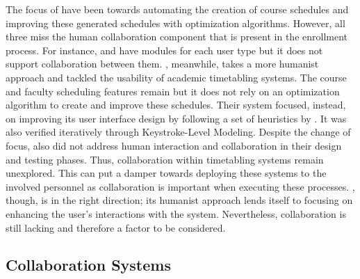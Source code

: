 The focus of \cite{Assyst, Assyst2, eAssyst, UPM, bulacanState, 2013Nigeria, Oprea2007, UniTime} have been towards automating the creation of course schedules and improving these generated schedules with optimization algorithms. However, all three miss the human collaboration component that is present in the enrollment process. For instance, \cite{Assyst} and \cite{Assyst2} have modules for each user type but it does not support collaboration between them. \cite{arrowSmith}, meanwhile, takes a more humanist approach and tackled the usability of academic timetabling systems. The course and faculty scheduling features remain but it does not rely on an optimization algorithm to create and improve these schedules. Their system focused, instead, on improving its user interface design by following a set of heuristics by \cite{Paz}. It was also verified iteratively through Keystroke-Level Modeling. Despite the change of focus, \cite{arrowSmith} also did not address human interaction and collaboration in their design and testing phases. Thus, collaboration within timetabling systems remain unexplored. This can put a damper towards deploying these systems to the involved personnel as collaboration is important when executing these processes. \cite{arrowSmith}, though, is in the right direction; its humanist approach lends itself to focusing on enhancing the user's interactions with the system. Nevertheless, collaboration is still lacking and therefore a factor to be considered.


\subsection{Collaboration Systems}

